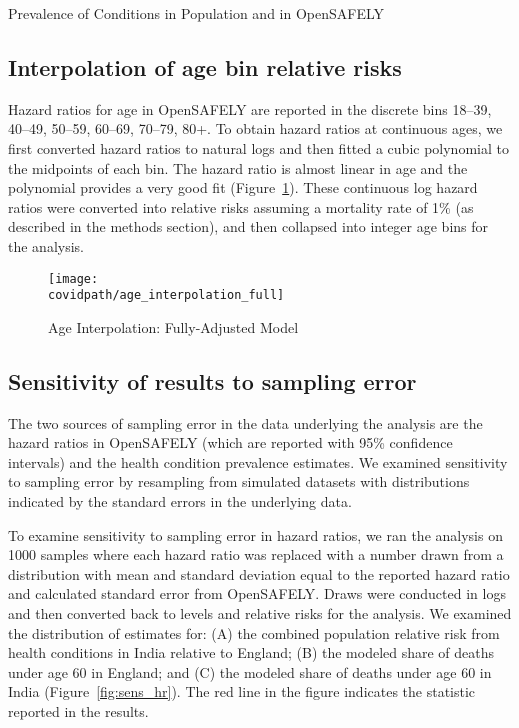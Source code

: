 \documentclass[10pt,letterpaper]{article}
\numberwithin{equation}{section}
\begin{document}
\begin{table}[H]
  \begin{center}
    \caption{Prevalence of Conditions in Population and in OpenSAFELY}
    \label{tab:sumhr}
    
    
  \end{center}
\end{table}

\clearpage
\subsection{Interpolation of age bin relative risks}

Hazard ratios for age in OpenSAFELY are reported in the discrete bins 18--39, 40--49, 50--59, 60--69, 70--79, 80+. To obtain hazard ratios at continuous ages, we first converted hazard ratios to natural logs and then fitted a cubic polynomial to the midpoints of each bin. The hazard ratio is almost linear in age and the polynomial provides a very good fit (Figure~\ref{fig:interp}). These continuous log hazard ratios were converted into relative risks assuming a mortality rate of 1\% (as described in the methods section), and then collapsed into integer age bins for the analysis.

\begin{figure}[H]
  \begin{center}
    \caption{Age Interpolation: Fully-Adjusted Model}
    \label{fig:interp}
    
    \texttt{[image: \\covidpath/age\_interpolation\_full]}
    
  \end{center}
\end{figure}

\clearpage
\subsection{Sensitivity of results to sampling error} 

The two sources of sampling error in the data underlying the analysis are the hazard ratios in OpenSAFELY (which are reported with 95\% confidence intervals) and the health condition prevalence estimates. We examined sensitivity to sampling error by resampling from simulated datasets with distributions indicated by the standard errors in the underlying data.

To examine sensitivity to sampling error in hazard ratios, we ran the analysis on 1000 samples where each hazard ratio was replaced with a number drawn from a distribution with mean and standard deviation equal to the reported hazard ratio and calculated standard error from OpenSAFELY. Draws were conducted in logs and then converted back to levels and relative risks for the analysis. We examined the distribution of estimates for: (A) the combined population relative risk from health conditions in India relative to England; (B) the modeled share of deaths under age 60 in England; and (C) the modeled share of deaths under age 60 in India (Figure~\ref{fig:sens_hr}). The red line in the figure indicates the statistic reported in the results.
\end{document}
